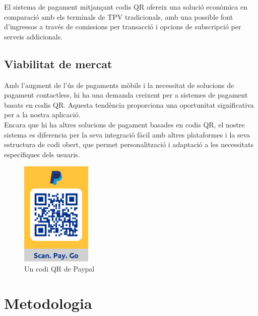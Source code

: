 \documentclass[a4paper,12pt,twoside]{ThesisStyle}
\begin{document}
El sistema de pagament mitjançant codis QR ofereix una solució econòmica en comparació amb els terminals de TPV tradicionals, amb una possible font d'ingressos a través de comissions per transacció i opcions de subscripció per serveis addicionals.



\section{Viabilitat de mercat}
\label{subsec:Viabilitat de mercat}

Amb l'augment de l'ús de pagaments mòbils i la necessitat de solucions de pagament contactless, hi ha una demanda creixent per a sistemes de pagament basats en codis QR. Aquesta tendència proporciona una oportunitat significativa per a la nostra aplicació.\\

Encara que hi ha altres solucions de pagament basades en codis QR, el nostre sistema es diferencia per la seva integració fàcil amb altres plataformes i la seva estructura de codi obert, que permet personalització i adaptació a les necessitats específiques dels usuaris.

\begin{figure}[h!] %
    \centering
    \includegraphics[width=0.3\textwidth]{imatges/paypal.png} %
    \caption{Un codi QR de Paypal} %
    \label{fig:Un codi QR de Paypal} %
  \end{figure}



\chapter{Metodologia}
\label{chp:metodologia}
\end{document}
